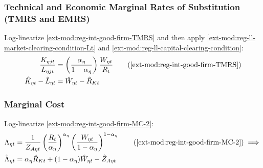 \documentclass[../thesis.tex]{subfiles}
\begin{document}
\begin{comment}
	Subtract \ref{ext-mod:reg-ll-int-good-firm-FOC-Lt} from \ref{ext-mod:reg-ll-int-good-firm-FOC-Kt}:
	\begin{align}
		\hat{K}_{\eta t} - \hat{L}_{\eta t} &= \hat{Y}_{\eta t} + \hat{\Lambda}_{\eta t} - \hat{R}_{K t} - (\hat{Y}_{\eta t} + \hat{\Lambda}_{\eta t} - \hat{W}_{\eta t}) \implies \nonumber \\
		\hat{K}_{\eta t} - \hat{L}_{\eta t} &= \hat{W}_{\eta t} - \hat{R}_{K t} \label{ext-mod:reg-ll-int-good-firm-TMRS}
	\end{align}
	
	Equation \ref{ext-mod:reg-ll-int-good-firm-TMRS} is the log-linearized version of \ref{ext-mod:reg-int-good-firm-TMRS}.
	
\end{comment}

\subsubsection*{Technical and Economic Marginal Rates of Substitution (TMRS and EMRS)}

	Log-linearize \ref{ext-mod:reg-int-good-firm-TMRS} and then apply \ref{ext-mod:reg-ll-market-clearing-condition-Lt} and \ref{ext-mod:reg-ll-capital-clearing-condition}:
	\begin{align}
		\frac{K_{\eta jt}}{L_{\eta jt}} &= \left( \frac{{\alpha_{\eta}}}{1-\alpha_{\eta}} \right) \frac{W_{\eta t}}{R_{t}} \tag{\ref{ext-mod:reg-int-good-firm-TMRS}} \\
		\hat{K}_{\eta t} - \hat{L}_{\eta t} &= \hat{W}_{\eta t} - \hat{R}_{K t} \label{ext-mod:reg-ll-int-good-firm-TMRS}
	\end{align}

\subsubsection*{Marginal Cost}

Log-linearize \ref{ext-mod:reg-int-good-firm-MC-2}:
\begin{align}
	\Lambda_{\eta t} &= \frac{1}{Z_{A\eta t}} \left( \frac{R_{t}}{{\alpha_{\eta}}} \right)^{{\alpha_{\eta}}} \left( \frac{W_{\eta t}}{1-\alpha_{\eta}} \right)^{1-\alpha_{\eta}} \tag{\ref{ext-mod:reg-int-good-firm-MC-2}} \implies \\
	\hat{\Lambda}_{\eta t} &= {\alpha_{\eta}} \hat{R}_{Kt} + (1- {\alpha_{\eta}}) \hat{W}_{\eta t} - \hat{Z}_{A\eta t} \label{ext-mod:reg-ll-int-good-firm-MC-2}
\end{align}
\end{document}
